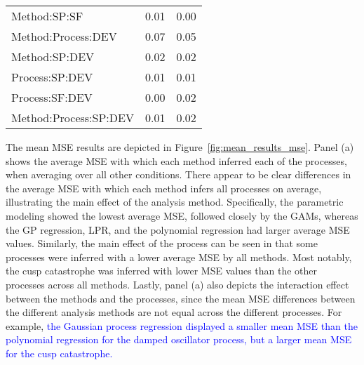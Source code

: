 \documentclass[man, floatsintext]{apa7}
\begin{document}
\begin{table}[tbp]
\begin{center}
\begin{threeparttable}
\begin{tabular}{lll}
        \\
        Method:SP:SF          & 0.01                                     & 0.00
        \\
        Method:Process:DEV    & 0.07                                     & 0.05
        \\
        Method:SP:DEV         & 0.02                                     & 0.02
        \\
        Process:SP:DEV        & 0.01                                     & 0.01
        \\
        Process:SF:DEV        & 0.00                                     & 0.02
        \\
        Method:Process:SP:DEV & 0.01                                     & 0.02
        \\
        \bottomrule
      \end{tabular}
    \end{threeparttable}
  \end{center}
\end{table}

The mean MSE results are depicted in Figure~\ref{fig:mean_results_mse}. Panel
(a) shows the average MSE with which each method inferred each of the
processes, when averaging over all other conditions. There appear to be clear
differences in the average MSE with which each method infers all processes on
average, illustrating the main effect of the analysis method. Specifically, the
parametric modeling showed the lowest average MSE, followed closely by the
GAMs, whereas the GP regression, LPR, and the polynomial regression had larger
average MSE values. Similarly, the main effect of the process can be seen in
that some processes were inferred with a lower average MSE by all methods. Most
notably, the cusp catastrophe was inferred with lower MSE values than the other
processes across all methods. Lastly, panel (a) also depicts the interaction
effect between the methods and the processes, since the mean MSE differences
between the different analysis methods are not equal across the different
processes. For example, \textcolor{blue}{the Gaussian process regression
  displayed a smaller mean MSE than the polynomial regression for the damped
  oscillator process, but a larger mean MSE for the cusp catastrophe.}
\end{document}
